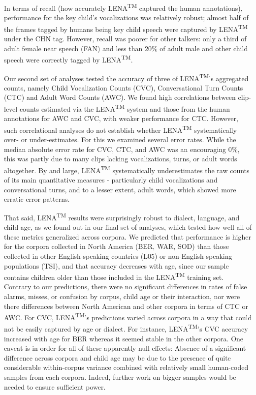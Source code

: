 \documentclass[english,floatsintext,man]{apa6}
\begin{document}
In terms of recall (how accurately LENA\textsuperscript{TM} captured the
human annotations), performance for the key child's vocalizations was
relatively robust; almost half of the frames tagged by humans being key
child speech were captured by LENA\textsuperscript{TM} under the CHN
tag. However, recall was poorer for other talkers: only a third of adult
female near speech (FAN) and less than 20\% of adult male and other
child speech were correctly tagged by LENA\textsuperscript{TM}.

Our second set of analyses tested the accuracy of three of
LENA\textsuperscript{TM}'s aggregated counts, namely Child Vocalization
Counts (CVC), Conversational Turn Counts (CTC) and Adult Word Counts
(AWC). We found high correlations between clip-level counts estimated
via the LENA\textsuperscript{TM} system and those from the human
annotations for AWC and CVC, with weaker performance for CTC. However,
such correlational analyses do not establish whether
LENA\textsuperscript{TM} systematically over- or under-estimates. For
this we examined several error rates. While the median absolute error
rate for CVC, CTC, and AWC was an encouraging 0\%, this was partly due
to many clips lacking vocalizations, turns, or adult words altogether.
By and large, LENA\textsuperscript{TM} systematically underestimates the
raw counts of its main quantitative measures - particularly child
vocalizations and conversational turns, and to a lesser extent, adult
words, which showed more erratic error patterns.

That said, LENA\textsuperscript{TM} results were surprisingly robust to
dialect, language, and child age, as we found out in our final set of
analyses, which tested how well all of these metrics generalized across
corpora. We predicted that performance is higher for the corpora
collected in North America (BER, WAR, SOD) than those collected in other
English-speaking countries (L05) or non-English speaking populations
(TSI), and that accuracy decreases with age, since our sample contains
children older than those included in the LENA\textsuperscript{TM}
training set. Contrary to our predictions, there were no significant
differences in rates of false alarms, misses, or confusion by corpus,
child age or their interaction, nor were there differences between North
American and other corpora in terms of CTC or AWC. For CVC,
LENA\textsuperscript{TM}'s predictions varied across corpora in a way
that could not be easily captured by age or dialect. For instance,
LENA\textsuperscript{TM}'s CVC accuracy increased with age for BER
whereas it seemed stable in the other corpora. One caveat is in order
for all of these apparently null effects: Absence of a significant
difference across corpora and child age may be due to the presence of
quite considerable within-corpus variance combined with relatively small
human-coded samples from each corpora. Indeed, further work on bigger
samples would be needed to ensure sufficient power.
\end{document}
